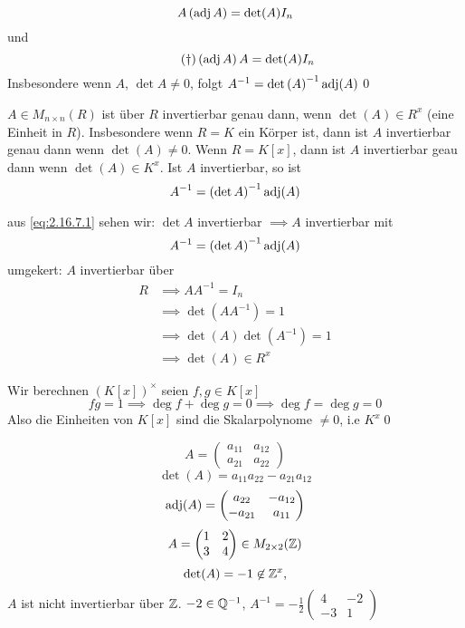 \begin{subcorollary}
	\[
		A \left( \operatorname{adj} A \right) = \det(A) I_n
	\]
	und
	\begin{equation}
		\label{eq:2.16.7.1}
		\tag{$ \dag $}
		\left( \operatorname{adj} A \right) A = \det(A) I_n
	\end{equation}
	Insbesondere wenn $ A $, $ \det A \neq 0 $, folgt $ A^{-1} = \det\left( A \right) ^{-1} \operatorname{adj}(A) $\qed
\end{subcorollary}

\begin{subtheorem}
	$ A \in M_{n \times n} (R) $ ist über $ R $ invertierbar genau dann, wenn $ \det(A) \in R^x $ (eine Einheit in $ R $).
	Insbesondere wenn $ R = K $ ein Körper ist, dann ist $ A $ invertierbar genau dann wenn $ \det(A) \neq 0 $.
	Wenn $ R = K[x] $, dann ist $ A $ invertierbar geau dann wenn $ \det(A) \in K^x $.
	Ist $ A $ invertierbar, so ist
	\[
		A^{-1} = \left( \det A \right) ^{-1} \operatorname{adj}(A)
	\]
\end{subtheorem}
\begin{subproof*}
	aus \eqref{eq:2.16.7.1} sehen wir:
	$ \det A $ invertierbar $ \implies A $ invertierbar mit
	\[
		A^{-1} = \left( \det A \right) ^{-1} \operatorname{adj} (A)
	\]
	umgekert:
	$ A $ invertierbar über
	\begin{align*}
		R &\implies A A^{-1} = I_n \\
		  &\implies \det\left( A A^{-1}  \right) = 1 \\
		  &\implies \det\left( A \right) \det\left( A^{-1}  \right) = 1 \\
		  &\implies \det(A) \in R^x
	\end{align*}
\end{subproof*}

Wir berechnen $ \left( K[x] \right) ^\times  $ seien $ f, g \in K[x] $ 
\[
	fg = 1 \implies \deg f + \deg g = 0 \implies \deg f = \deg g = 0
\]
Also die Einheiten von $ K[x] $ sind die Skalarpolynome $ \neq 0 $, i.e $ K^x $\qed

\begin{subexample}
	\[
		A =
		\begin{pmatrix} 
			a_{11} & a_{12} \\
			a_{21} & a_{22}
		\end{pmatrix} 
	\]
	\[
		\det(A) = a_{11}a_{22} - a_{21}a_{12}
	\]
	\[
		\operatorname{adj}(A) =
		\begin{pmatrix} 
			a_{22} & -a_{12} \\
			- a_{21} & a_{11}
		\end{pmatrix} 
	\]
	\[
		A =
		\begin{pmatrix} 
			1 & 2 \\
			3 & 4
		\end{pmatrix} 
		\in M_{2 \times 2} (\mathbb{Z} )
	\]
	\[
		\det(A) = -1 \not\in \mathbb{Z} ^x,
	\]
	$ A $ ist nicht invertierbar über $ \mathbb{Z}  $.
	$ -2 \in \mathbb{Q} ^{-1}  $, $ A^{-1} = -\frac{ 1 }{ 2 } \begin{pmatrix} 4 & -2 \\ -3 & 1 \end{pmatrix}  $
\end{subexample}

